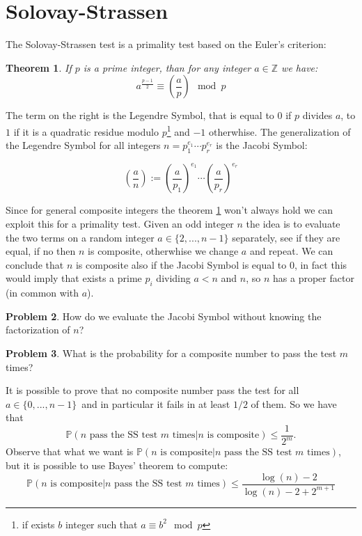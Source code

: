\documentclass{article}
\newcommand{\ZZ}{\mathbb{Z}}
\newcommand{\PP}{\mathbb{P}}
\theoremstyle{plain}
\newtheorem{teo}{Theorem}[section]
\theoremstyle{remark}
\theoremstyle{definition}
\newtheorem{prob}[teo]{Problem}
\begin{document}
\section{Solovay-Strassen}

The Solovay-Strassen test is a primality test based on the Euler's criterion:
\begin{teo}\label{teo:eu_quad}
	If $p$ is a prime integer, than for any integer $a \in \ZZ$ we have:
	\[ a^{\frac{p-1}{2}} \equiv \left(\dfrac{a}{p}\right) \mod p \]
\end{teo}

The term on the right is the Legendre Symbol, that is equal to $0$ if $p$ divides $a$, to $1$ if it is a quadratic residue modulo $p$\footnote{if exists $b$ integer such that $a \equiv b^2 \mod p$} and $-1$ otherwhise. The generalization of the Legendre Symbol for all integers $n = p_1^{e_1} \cdots p_r^{e_r}$ is the Jacobi Symbol: 

\[ \left(\dfrac{a}{n}\right) := \left(\dfrac{a}{p_1}\right)^{e_1} \cdots \left(\dfrac{a}{p_r}\right)^{e_r} \] 
	
Since for general composite integers the theorem \ref{teo:eu_quad} won't always hold we can exploit this for a primality test. Given an odd integer $n$ the idea is to evaluate the two terms on a random integer $a\in \{2,...,n-1\}$ separately, see if they are equal, if no then $n$ is composite, otherwhise we change $a$ and repeat. We can conclude that $n$ is composite also if the Jacobi Symbol is equal to $0$, in fact this would imply that exists a prime $p_i$ dividing $a<n$ and $n$, so $n$ has a proper factor (in common with $a$). 

\begin{prob}\label{prob:jacobi}
	How do we evaluate the Jacobi Symbol without knowing the factorization of $n$?
\end{prob}

\begin{prob}\label{prob:eff_ss}
	What is the probability for a composite number to pass the test $m$ times?
\end{prob}

It is possible to prove that no composite number pass the test for all $a\in\{0,...,n-1\}$ and in particular it fails in at least $1/2$ of them. So we have that 
\begin{equation}
	\label{eq:prob_SS}
\PP(n \text{ pass the SS test }m\text{ times}|n\text{ is composite})\leq \frac{1}{2^m} .
\end{equation}
Observe that what we want is $\PP(n\text{ is composite}|n \text{ pass the SS test }m\text{ times})$, but it is possible to use Bayes' theorem to compute:
\begin{equation}
	\label{eq:prob_SS_good}
	\PP(n\text{ is composite}|n \text{ pass the SS test }m\text{ times})
	\leq
	\frac{\log(n) - 2}{\log(n) - 2 + 2^{m+1}}
\end{equation}
\end{document}
